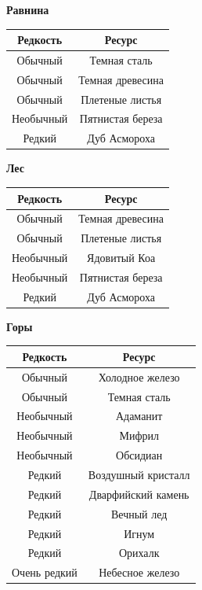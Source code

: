 \documentclass[a4paper, 9pt, twocolumn]{book}
\begin{document}
	\begin{minipage}{0.45\linewidth}
		\centering
		\textbf{Равнина}
		
		\begin{tabular}{|c|c|}
			\hline
			\textbf{Редкость} & \textbf{Ресурс} \\
			\hline
			Обычный & Темная сталь \\
			\hline
			Обычный & Темная древесина \\
			\hline
			Обычный & Плетеные листья \\
			\hline
			Необычный & Пятнистая береза \\
			\hline
			Редкий & Дуб Асмороха \\
			\hline
		\end{tabular}
	
		\medspace
		
		\textbf{Лес}
		
		\begin{tabular}{|c|c|}
			\hline
			\textbf{Редкость} & \textbf{Ресурс} \\
			\hline
			Обычный & Темная древесина \\
			\hline
			Обычный & Плетеные листья \\
			\hline
			Необычный & Ядовитый Коа \\
			\hline
			Необычный & Пятнистая береза \\
			\hline
			Редкий & Дуб Асмороха \\
			\hline
		\end{tabular}
	
		\medspace
		
		\textbf{Горы}
		
		 \begin{tabular}{|c|c|}
		 	\hline
		 	\textbf{Редкость} & \textbf{Ресурс} \\
		 	\hline
		 	Обычный & Холодное железо \\
		 	\hline
		 	Обычный & Темная сталь \\
		 	\hline
		 	Необычный & Адаманит \\
		 	\hline
		 	Необычный & Мифрил \\
		 	\hline
		 	Необычный & Обсидиан \\
		 	\hline
		 	Редкий & Воздушный кристалл \\
		 	\hline
		 	Редкий & Дварфийский камень \\
		 	\hline
		 	Редкий & Вечный лед \\
		 	\hline
		 	Редкий & Игнум \\
		 	\hline
		 	Редкий & Орихалк \\
		 	\hline
		 	Очень редкий & Небесное железо \\
		 	\hline
		 \end{tabular}
	 

\end{minipage}
\end{document}
